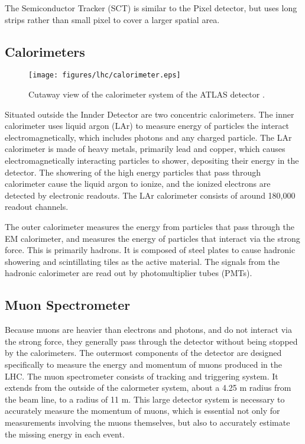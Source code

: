 The Semiconductor Tracker (SCT) is similar to the Pixel detector, but uses long strips rather than small pixel to cover a larger spatial area.

\subsection{Calorimeters}
\label{sec:calo}

\begin{figure}[H]
\centering
   \texttt{[image: figures/lhc/calorimeter.eps]}
\caption{Cutaway view of the calorimeter system of the ATLAS detector \cite{caloFig}.}
\label{fig:calo}
\end{figure}

Situated outside the Innder Detector are two concentric calorimeters. The inner calorimeter uses liquid argon (LAr) to measure energy of particles the interact electromagnetically, which includes photons and any charged particle. The LAr calorimeter is made of heavy metals, primarily lead and copper, which causes electromagnetically interacting particles to shower, depositing their energy in the detector. The showering of the high energy particles that pass through calorimeter cause the liquid argon to ionize, and the ionized electrons are detected by electronic readouts. The LAr calorimeter consists of around 180,000 readout channels.  

The outer calorimeter measures the energy from particles that pass through the EM calorimeter, and measures the energy of particles that interact via the strong force. This is primarily hadrons. It is composed of steel plates to cause hadronic showering and scintillating tiles as the active material. The signals from the hadronic calorimeter are read out by photomultiplier tubes (PMTs).

\subsection{Muon Spectrometer}
\label{sec:muonSpec}

Because muons are heavier than electrons and photons, and do not interact via the strong force, they generally pass through the detector without being stopped by the calorimeters. The outermost components of the detector are designed specifically to measure the energy and momentum of muons produced in the LHC. The muon spectrometer consists of tracking and triggering system. It extends from the outside of the calormeter system, about a 4.25 m radius from the beam line, to a radius of 11 m. This large detector system is necessary to accurately measure the momentum of muons, which is essential not only for measurements involving the muons themselves, but also to accurately estimate the missing energy in each event.

